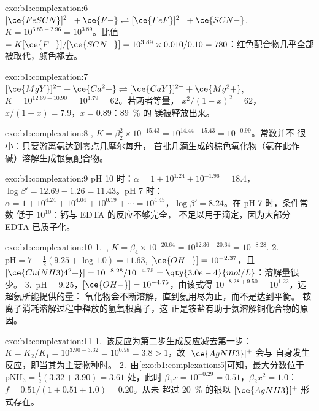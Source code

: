 \begin{solution}{exo:b1:complexation:6}
$[\ce{FeSCN}]^{2+} + \ce{F-} \rightleftharpoons [\ce{FeF}]^{2+} + \ce{SCN-}$,
$K = 10^{6.85 - 2.96} = 10^{3.89}$。比值 $= K[\ce{F-}]/[\ce{SCN-}] =
10^{3.89} \times 0.010/0.10 = 780$：红色配合物几乎全部
被取代，颜色褪去。
\end{solution}

\begin{solution}{exo:b1:complexation:7}
$[\ce{MgY}]^{2-} + \ce{Ca^2+} \rightleftharpoons [\ce{CaY}]^{2-} + \ce{Mg^2+}$,
$K = 10^{12.69 - 10.90} = 10^{1.79} = 62$。若两者等量，
$x^2/(1 - x)^2 = 62$，$x/(1 - x) = 7.9$，$x = 0.89$：\qty{89}{\percent} 的
镁被释放出来。
\end{solution}

\begin{solution}{exo:b1:complexation:8}
, $K = \beta_2^2 \times
10^{-15.43} = 10^{14.44 - 15.43} = 10^{-0.99}$。常数并不
很小：只要游离氨达到零点几摩尔每升，
首批几滴生成的棕色氧化物（氨在此作
碱）溶解生成银氨配合物。
\end{solution}

\begin{solution}{exo:b1:complexation:9}
pH 10 时：$\alpha = 1 + 10^{1.24} + 10^{-1.96} = 18.4$，$\log\beta' = 12.69 -
1.26 = 11.43$。pH 7 时：$\alpha = 1 + 10^{4.24} + 10^{4.04} + 10^{0.19} +
\cdots = 10^{4.45}$，$\log\beta' = 8.24$。在 pH 7 时，条件常数
低于 $10^{10}$：钙与 EDTA 的反应不够完全，
不足以用于滴定，因为大部分 EDTA 已质子化。
\end{solution}

\begin{solution}{exo:b1:complexation:10}
1.~, $K = \beta_4 \times
10^{-20.64} = 10^{12.36 - 20.64} = 10^{-8.28}$.
2.~$\mathrm{pH} = 7 + \frac12(9.25 + \log 1.0) = 11.63$, $[\ce{OH-}] =
10^{-2.37}$，且 $[\ce{Cu(NH3)4^2+}] = 10^{-8.28}/10^{-4.75} =
\qty{3.0e-4}{mol/L}$：溶解量很少。
3.~$\mathrm{pH} = 9.25$，$[\ce{OH-}] = 10^{-4.75}$，由该式得
$10^{-8.28 + 9.50} = 10^{1.22}$，远超氨所能提供的量：
氧化物会不断溶解，直到氨用尽为止，而不是达到平衡。
铵离子消耗溶解过程中释放的氢氧根离子，这
正是铵盐有助于氨溶解铜化合物的原因。
\end{solution}

\begin{solution}{exo:b1:complexation:11}
1.~该反应为第二步生成反应减去第一步：$K = K_2/K_1 =
10^{3.90 - 3.32} = 10^{0.58} = 3.8 > 1$，故 $[\ce{AgNH3}]^{+}$ 会与
自身发生反应，即当其为主要物种时。
2.~由\cref{exo:b1:complexation:5}可知，最大分数位于
$\mathrm{pNH_3} = \frac12(3.32 + 3.90) = 3.61$ 处，此时 $\beta_1 x = 10^{-0.29}
= 0.51$，$\beta_2x^2 = 1.0$：$f = 0.51/(1 + 0.51 + 1.0) = 0.20$。从未
超过 \qty{20}{\percent} 的银以 $[\ce{AgNH3}]^{+}$ 形式存在。
\end{solution}

